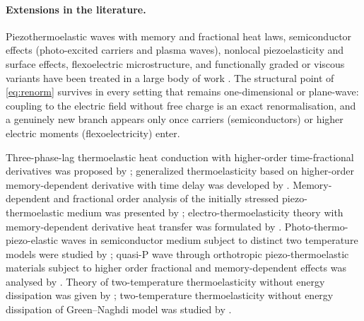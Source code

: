 \paragraph{Extensions in the literature.} Piezothermoelastic waves with memory and fractional heat laws, semiconductor effects (photo-excited carriers and plasma waves), nonlocal piezoelasticity and surface effects, flexoelectric microstructure, and functionally graded or viscous variants have been treated in a large body of work \citep{Gupta2023,Gupta2024a,Gupta2026HeatMap,Das2026,Zang2014,Li2018,Liu2020,Singh2020c,Kumar2024,Kumar2024a,Abouelregal2023,Srivastava2026}. The structural point of \eqref{eq:renorm} survives in every setting that remains one-dimensional or plane-wave: coupling to the electric field without free charge is an exact renormalisation, and a genuinely new branch appears only once carriers (semiconductors) or higher electric moments (flexoelectricity) enter.

Three-phase-lag thermoelastic heat conduction with higher-order time-fractional derivatives was proposed by \citep{Abouelregal2019}; generalized thermoelasticity based on higher-order memory-dependent derivative with time delay was developed by \citep{Abouelregal2021}. Memory-dependent and fractional order analysis of the initially stressed piezo-thermoelastic medium was presented by \citep{Barak2023a}; electro-thermoelasticity theory with memory-dependent derivative heat transfer was formulated by \citep{Ezzat2016a}. Photo-thermo-piezo-elastic waves in semiconductor medium subject to distinct two temperature models were studied by \citep{Gupta2023a}; quasi-P wave through orthotropic piezo-thermoelastic materials subject to higher order fractional and memory-dependent effects was analysed by \citep{Gupta2023b}. Theory of two-temperature thermoelasticity without energy dissipation was given by \citep{Youssef2011}; two-temperature thermoelasticity without energy dissipation of Green--Naghdi model was studied by \citep{Youssef2014}.

